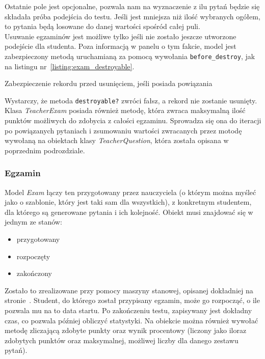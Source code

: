 \documentclass[a4paper,12pt]{article}
\begin{document}
Ostatnie pole jest opcjonalne, pozwala nam na wyznaczenie z ilu pytań będzie się składała
próba podejścia do testu. Jeśli jest mniejsza niż ilość wybranych ogółem, to pytania będą
losowane do danej wartości spośród całej puli.\\
Usuwanie egzaminów jest możliwe tylko jeśli nie zostało jeszcze utworzone podejście dla
studenta. Poza informacją w panelu o tym fakcie, model jest zabezpieczony metodą
uruchamianą za pomocą wywołania \texttt{before\_destroy}, jak na listingu
nr~\ref{listing:exam_destroyable}.

\begin{listing}
  
  \caption{Zabezpieczenie rekordu przed usunięciem, jeśli posiada powiązania}
  \label{listing:exam_destroyable}
\end{listing}


Wystarczy, że metoda \texttt{destroyable?} zwróci fałsz, a rekord nie zostanie usunięty.
Klasa \emph{TeacherExam} posiada również metodę, która zwraca maksymalną ilość punktów
możliwych do zdobycia z całości egzaminu. Sprowadza się ona do iteracji po powiązanych
pytaniach i zsumowaniu wartości zwracanych przez motodę wywołaną na obiektach
klasy \emph{TeacherQuestion}, która została opisana w poprzednim podrozdziale.

\subsubsection{Egzamin}
Model \emph{Exam} łączy ten przygotowany przez nauczyciela (o którym można myśleć jako
o szablonie, który jest taki sam dla wszystkich), z konkretnym studentem, dla którego są
generowane pytania i ich kolejność. Obiekt musi znajdować się w jednym ze stanów:

\begin{itemize}
  \item{przygotowany}
  \item{rozpoczęty}
  \item{zakończony}
\end{itemize}


Zostało to zrealizowane przy pomocy maszyny stanowej, opisanej dokładniej na
stronie~\pageref{sec:state_machine}. Student, do którego został przypisany egzamin, może
go rozpocząć, o ile pozwala mu na to data startu. Po zakończeniu testu, zapisywany jest
dokładny czas, co pozwala później obliczyć statystyki. Na obiekcie można również wywołać
metodę zliczającą zdobyte punkty oraz wynik procentowy (liczony jako iloraz zdobytych
punktów oraz maksymalnej, możliwej liczby dla danego zestawu pytań).
\end{document}

